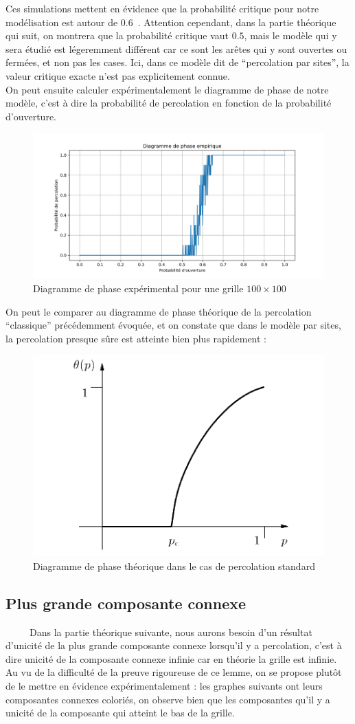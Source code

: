 \documentclass[11pt,a4paper]{article}
\begin{document}
Ces simulations mettent en évidence que la probabilité critique pour notre modélisation est autour de $0.6$\ . Attention cependant, dans la partie théorique qui suit, on montrera que la probabilité critique vaut $0.5$, mais le modèle qui y sera étudié est légeremment différent car ce sont les arêtes qui y sont ouvertes ou fermées, et non pas les cases. Ici, dans ce modèle dit de ``percolation par sites'', la valeur critique exacte n'est pas explicitement connue. \\

On peut ensuite calculer expérimentalement le diagramme de phase de notre modèle, c'est à dire la probabilité de percolation en fonction de la probabilité d'ouverture.
\begin{figure}[htbp]
    \centering
    \includegraphics[width=0.6 \textwidth]{percolation_probability.png}
    \caption{Diagramme de phase expérimental pour une grille $100\times 100$}
    \label{fig:evol}
\end{figure}

On peut le comparer au diagramme de phase théorique de la percolation ``classique'' précédemment évoquée, et on constate que dans le modèle par sites, la percolation presque sûre est atteinte bien plus rapidement : 

\begin{figure}[htbp]
    \centering
    \includegraphics[width=0.4 \textwidth]{ph_th.png}
    \caption{Diagramme de phase théorique dans le cas de percolation standard \cite{grimmett}}
    \label{fig:evol}
\end{figure}

\subsection{Plus grande composante connexe}
\ \ \ \ \ Dans la partie théorique suivante, nous aurons besoin d'un résultat d'unicité de la plus grande composante connexe lorsqu'il y a percolation, c'est à dire unicité de la composante connexe infinie car en théorie la grille est infinie. Au vu de la difficulté de la preuve rigoureuse de ce lemme, on se propose plutôt de le mettre en évidence expérimentalement : les graphes suivants ont leurs composantes connexes coloriés, on observe bien que les composantes qu'il y a unicité de la composante qui atteint le bas de la grille. 
\end{document}
